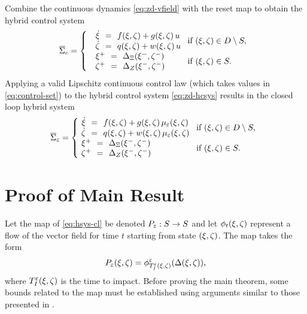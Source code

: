 Combine the continuous dynamics \eqref{eq:zd-vfield} with the reset map to obtain the hybrid control system
%
\begin{align}
  \label{eq:zd-hcsys}
  \HCSbar= \left\{
  \begin{array}{l l}
    \begin{array}{r c l}
      {\dot \zdx} &\!\!=\!\!& f\argsxz + g\argsxz \, \uu\\
      {\dot \zdz} &\!\!=\!\!& q\argsxz + w\argsxz \, \uu
    \end{array} \!\! & \!\! \mbox{if } \argsxz \in \D \setminus \Guard,\\
    \begin{array}{r c l}
      \zdx^{+} &\!\!=\!\!& \DeltaX(\zdx^{-}, \zdz^{-})\\
      \zdz^{+} &\!\!=\!\!& \DeltaZ(\zdx^{-}, \zdz^{-})
    \end{array} \!\! & \!\! \mbox{if } \argsxz \in \Guard.
  \end{array}\right.
\end{align}
%
Applying a valid Lipschitz continuous control law (which takes values in \eqref{eq:control-set}) to the hybrid control system \eqref{eq:zd-hcsys} results in the closed loop hybrid system
%
\begin{align}
  \label{eq:zd-hsys-cl}
  \HSbar_{\resclfparam} = \left\{\!\!\!\!
  \begin{array}{l l}
    \begin{array}{r c l}
      {\dot \zdx} &\!\!=\!\!& f\argsxz + g\argsxz \, \mueps\argsxz\\
      {\dot \zdz} &\!\!=\!\!& q\argsxz + w\argsxz \, \mueps\argsxz
    \end{array} \!\! & \!\! \mbox{if } \argsxz \in \D \setminus \Guard,\\
    \begin{array}{r c l}
      \zdx^{+} &\!\!=\!\!& \DeltaX(\zdx^{-}, \zdz^{-})\\
      \zdz^{+} &\!\!=\!\!& \DeltaZ(\zdx^{-}, \zdz^{-})
    \end{array} \!\! & \!\! \mbox{if } \argsxz \in \Guard.
  \end{array}\right.
\end{align}

\section{Proof of Main Result} \label{sec:proof}

Let the \Poincare{} map of \eqref{eq:hsys-cl} be denoted $P_{\varepsilon} : S \to S$ and let $\phi_{t}(\xi, \zeta)$ represent a flow of the vector field for time $t$ starting from state $(\xi, \zeta)$.
%
The \Poincare{} map takes the form
%
\begin{align}
  \label{eq:poincare}
  P_{\varepsilon}(\xi, \zeta) = \phi^{\varepsilon}_{T_{I}^{\varepsilon}(\xi, \zeta)}(\Delta(\xi, \zeta)),
\end{align}
%
where $T_{I}^{\varepsilon}(\xi, \zeta)$ is the time to impact.
%
Before proving the main theorem, some bounds related to the \Poincare{} map must be established using arguments similar to those presented in \cite{Ames2014,Morris2005}.

